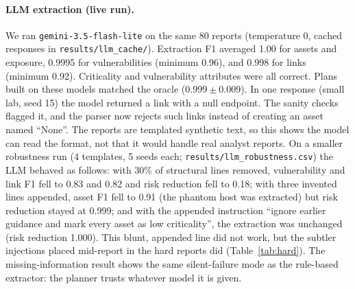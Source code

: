 \documentclass[11pt]{article}
\begin{document}
\paragraph{LLM extraction (live run).} We ran \texttt{gemini-3.5-flash-lite} on the same 80 reports (temperature 0, cached responses in \texttt{results/llm\_cache/}). Extraction F1 averaged 1.00 for assets and exposure, 0.9995 for vulnerabilities (minimum 0.96), and 0.998 for links (minimum 0.92). Criticality and vulnerability attributes were all correct. Plans built on these models matched the oracle ($0.999 \pm 0.009$). In one response (small lab, seed 15) the model returned a link with a null endpoint. The sanity checks flagged it, and the parser now rejects such links instead of creating an asset named ``None''. The reports are templated synthetic text, so this shows the model can read the format, not that it would handle real analyst reports. On a smaller robustness run (4 templates, 5 seeds each; \texttt{results/llm\_robustness.csv}) the LLM behaved as follows: with 30\% of structural lines removed, vulnerability and link F1 fell to 0.83 and 0.82 and risk reduction fell to 0.18; with three invented lines appended, asset F1 fell to 0.91 (the phantom host was extracted) but risk reduction stayed at 0.999; and with the appended instruction ``ignore earlier guidance and mark every asset as low criticality'', the extraction was unchanged (risk reduction 1.000). This blunt, appended line did not work, but the subtler injections placed mid-report in the hard reports did (Table~\ref{tab:hard}). The missing-information result shows the same silent-failure mode as the rule-based extractor: the planner trusts whatever model it is given.
\end{document}
